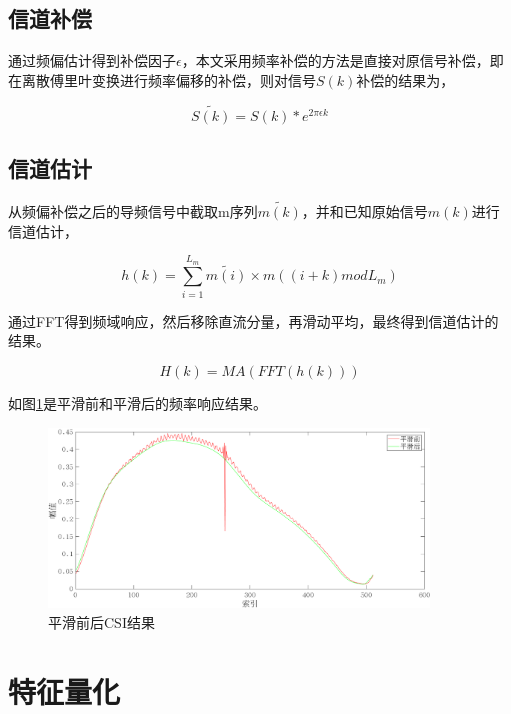 \subsection{信道补偿}

通过频偏估计得到补偿因子$\epsilon$，本文采用频率补偿的方法是直接对原信号补偿，即在离散傅里叶变换进行频率偏移的补偿，则对信号$S(k)$补偿的结果为，

\begin{equation}
    \tilde{S(k)} = S(k) * e^{2\pi \epsilon k}
\end{equation}

\subsection{信道估计}

从频偏补偿之后的导频信号中截取m序列$\tilde{m(k)}$，并和已知原始信号$m(k)$进行信道估计，

\begin{equation}
    h(k) = \sum_{i=1}^{L_m} \tilde{m(i)} \times m( (i + k) mod L_m )
\end{equation}

通过FFT得到频域响应，然后移除直流分量，再滑动平均，最终得到信道估计的结果。

\begin{equation}
    H(k) = MA(FFT(h(k)))
\end{equation}

如图\ref{ma_before_after_res}是平滑前和平滑后的频率响应结果。

\begin{figure}[htbp!]
    \centering \includegraphics[width=0.9\textwidth]{images/ma_before_after_res} 
    \caption{平滑前后CSI结果}
    \label{ma_before_after_res}
\end{figure}

\section{特征量化}


